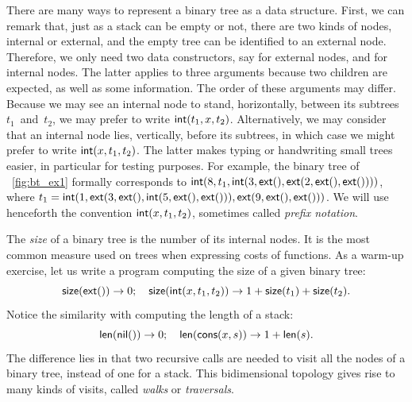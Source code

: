 There are many ways to represent a binary tree as a data
structure. First, we can remark that, just as a stack can be empty or
not, there are two kinds of nodes, internal or external, and the empty
tree can be identified to an external node. Therefore, we only need
two data constructors, say  for
external nodes, and  for internal
nodes. The latter applies to three arguments because two children are
expected, as well as some information. The order of these arguments
may differ. Because we may see an internal node to stand,
horizontally, between its subtrees \(t_1\)~and~\(t_2\), we may prefer
to write \(\textsf{int}(t_1,x,t_2)\). Alternatively, we may consider
that an internal node lies, vertically, before its subtrees, in which
case we might prefer to write \(\textsf{int}(x,t_1,t_2)\). The latter
makes typing or handwriting small trees easier, in particular for
testing purposes. For example, the binary tree of
\fig~\vref{fig:bt_ex1} formally corresponds to \(\textsf{int}(8, t_1,
\textsf{int}(3, \textsf{ext}(), \textsf{ext}(2, \textsf{ext}(), \textsf{ext}())))\),
where \(t_1=\textsf{int}(1, \textsf{ext}(3, \textsf{ext}(), \textsf{int}(5,
\textsf{ext}(), \textsf{ext}())), \textsf{ext}(9, \textsf{ext}(),
\textsf{ext}()))\). We will use henceforth the convention
\(\textsf{int}(x,t_1,t_2)\), sometimes called \emph{prefix
notation}.

The \emph{size} of a binary tree is the number
of its internal nodes. It is the most common measure used on trees
when expressing costs of functions. As a warm\hyp{}up exercise, let us
write a program computing the size of a given binary tree:
\begin{equation}
\fun{size}(\fun{ext}()) \rightarrow 0;\quad
\fun{size}(\fun{int}(x,t_1,t_2))
  \rightarrow 1 + \fun{size}(t_1) + \fun{size}(t_2).
\index{size@\fun{size/1}}
\label{eq:size}
\end{equation}
Notice the similarity with computing the length of a stack:
\begin{equation*}
\fun{len}(\fun{nil}()) \rightarrow 0;\quad
\fun{len}(\fun{cons}(x,s)) \rightarrow 1 + \fun{len}(s).
\index{len@\fun{len/1}}
\index{nil@\fun{nil/0}}
\index{cons@\fun{cons/2}}
\end{equation*}
The difference lies in that two recursive calls are needed to visit
all the nodes of a binary tree, instead of one for a stack. This
bidimensional topology gives rise to many kinds of visits, called
\emph{walks} or \emph{traversals}.

